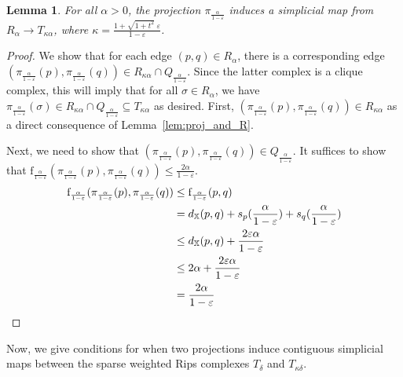 \documentclass[a4paper]{article}
\newcommand\X{\mathbb{X}}
\newcommand\dX[2]{d_\X(#1,#2)}
\newtheorem{lemma}[theorem]{Lemma}
\newcommand{\e}{\varepsilon}
\newcommand{\ff}{\mathrm{f}}
\newcommand{\proj}{\pi}
\begin{document}
  \begin{lemma}\label{lem:proj_is_simplicial_R_to_T}
    For all $\alpha> 0$, the projection $\proj_{\frac{\alpha}{1-\e}}$ induces a simplicial map from $R_\alpha\to T_{\kappa\alpha}$, where $\kappa = \frac{1 + \sqrt{1+t^2}\;\e}{1-\e}$.
  \end{lemma}
  \begin{proof}
    We show that for each edge $(p,q)\in R_\alpha$, there is a corresponding edge $(\proj_{\frac{\alpha}{1-\e}}(p), \proj_{\frac{\alpha}{1-\e}}(q)) \in R_{\kappa\alpha}\cap Q_{\frac{\alpha}{1-\e}}$.
    Since the latter complex is a clique complex, this will imply that for all $\sigma\in R_\alpha$, we have $\proj_{\frac{\alpha}{1-\e}}(\sigma)\in R_{\kappa\alpha}\cap Q_{\frac{\alpha}{1-\e}} \subseteq T_{\kappa\alpha}$ as desired.
    First, $(\proj_{\frac{\alpha}{1-\e}}(p), \proj_{\frac{\alpha}{1-\e}}(q)) \in R_{\kappa\alpha}$ as a direct consequence of Lemma~\ref{lem:proj_and_R}.

    Next, we need to show that $(\proj_{\frac{\alpha}{1-\e}}(p), \proj_{\frac{\alpha}{1-\e}}(q)) \in Q_{\frac{\alpha}{1-\e}}$.
    It suffices to show that $\ff_{\frac{\alpha}{1-\e}}(\proj_{\frac{\alpha}{1-\e}}(p), \proj_{\frac{\alpha}{1-\e}}(q))\le \frac{2 \alpha}{1-\e}$.
    \begin{align*}
      \ff_{\frac{\alpha}{1-\e}}(\proj_{\frac{\alpha}{1-\e}}(p), \proj_{\frac{\alpha}{1-\e}}(q))
        &\le \ff_{\frac{\alpha}{1-\e}}(p, q) \\ &= \dX{p}{q} + s_p({\frac{\alpha}{1-\e}}) + s_q({\frac{\alpha}{1-\e}}) \\
        &\le \dX{p}{q} + \frac{2\e\alpha}{1-\e}\\
        &\le 2 \alpha + \frac{2\e\alpha}{1-\e}\\
        &= \frac{2 \alpha}{1-\e}\qedhere
    \end{align*}
  \end{proof}
  
  Now, we give conditions for when two projections induce contiguous simplicial maps between the sparse weighted Rips complexes $T_\delta$ and $T_{\kappa\delta}$.
\end{document}
